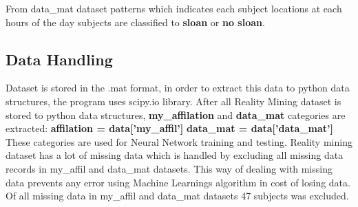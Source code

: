 \documentclass[paper=letter, fontsize=12pt]{article}
\begin{document}
From data\_mat dataset patterns which indicates each subject locations at each hours of the day subjects are classified to \textbf{sloan} or \textbf{no sloan}.
\subsection{Data Handling}
\label{sec:datahandling}
Dataset is stored in the .mat format, in order to extract this data to python data structures, the program uses scipy.io library.
After all Reality Mining dataset is stored to python data structures, \textbf{my\_affilation} and \textbf{data\_mat} categories are extracted:
\newline
\textbf{affilation = data['my\_affil']}
\newline
\textbf{data\_mat = data['data\_mat']}
\newline
These categories are used for Neural Network training and testing.
\newline
\newline
Reality mining dataset has a lot of missing data which is handled by excluding all missing data records in my\_affil and data\_mat datasets. This way of dealing with missing data prevents any error using Machine Learnings algorithm in cost of losing data. Of all missing data in my\_affil and data\_mat datasets 47 subjects was excluded. 
\end{document}
